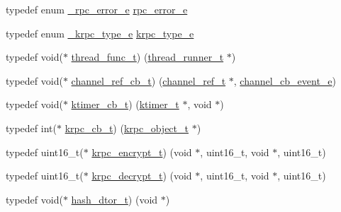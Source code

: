 \begin{DoxyCompactItemize}
\item 
typedef enum \hyperlink{a00044_a5a9afdfc8281994f0692b49499d731bf_a5a9afdfc8281994f0692b49499d731bf}{\+\_\+rpc\+\_\+error\+\_\+e} \hyperlink{a00044_aba1e847dfcabe31256c7f60abe0272a6_aba1e847dfcabe31256c7f60abe0272a6}{rpc\+\_\+error\+\_\+e}
\item 
typedef enum \hyperlink{a00044_aa250e66ac76155c15e3e1d24d0431931_aa250e66ac76155c15e3e1d24d0431931}{\+\_\+krpc\+\_\+type\+\_\+e} \hyperlink{a00044_a6bca3ecacad337637254bb43ab58a0b6_a6bca3ecacad337637254bb43ab58a0b6}{krpc\+\_\+type\+\_\+e}
\item 
typedef void($\ast$ \hyperlink{a00044_a46bcd8005e5d86fdbc6be5af0a77156c_a46bcd8005e5d86fdbc6be5af0a77156c}{thread\+\_\+func\+\_\+t}) (\hyperlink{a00044_a9054159cde2f926ef61c28ce1e555199_a9054159cde2f926ef61c28ce1e555199}{thread\+\_\+runner\+\_\+t} $\ast$)
\item 
typedef void($\ast$ \hyperlink{a00044_ae296ec4d1ce108960de8dcc423956a1d_ae296ec4d1ce108960de8dcc423956a1d}{channel\+\_\+ref\+\_\+cb\+\_\+t}) (\hyperlink{a00044_a151271c9d188ef28d4d24bb81dcc1263_a151271c9d188ef28d4d24bb81dcc1263}{channel\+\_\+ref\+\_\+t} $\ast$, \hyperlink{a00044_aaf2cba5d4035f3d56350b59342ebf65c_aaf2cba5d4035f3d56350b59342ebf65c}{channel\+\_\+cb\+\_\+event\+\_\+e})
\item 
typedef void($\ast$ \hyperlink{a00044_a2333fd0f2c3a85faf586300ca40deed4_a2333fd0f2c3a85faf586300ca40deed4}{ktimer\+\_\+cb\+\_\+t}) (\hyperlink{a00044_a846172ea4e8a86449eca41a3d8e074b7_a846172ea4e8a86449eca41a3d8e074b7}{ktimer\+\_\+t} $\ast$, void $\ast$)
\item 
typedef int($\ast$ \hyperlink{a00044_a06bb708c1b97445d3a5d0c1b32ad2ab6_a06bb708c1b97445d3a5d0c1b32ad2ab6}{krpc\+\_\+cb\+\_\+t}) (\hyperlink{a00044_a9c07dfc8c3b965f75b09f82fdb1bbb1e_a9c07dfc8c3b965f75b09f82fdb1bbb1e}{krpc\+\_\+object\+\_\+t} $\ast$)
\item 
typedef uint16\+\_\+t($\ast$ \hyperlink{a00044_ae41a67cc07f8dff897ca978e03b1f2d7_ae41a67cc07f8dff897ca978e03b1f2d7}{krpc\+\_\+encrypt\+\_\+t}) (void $\ast$, uint16\+\_\+t, void $\ast$, uint16\+\_\+t)
\item 
typedef uint16\+\_\+t($\ast$ \hyperlink{a00044_a5cf750f151c90f0589f68fe8c4421f1d_a5cf750f151c90f0589f68fe8c4421f1d}{krpc\+\_\+decrypt\+\_\+t}) (void $\ast$, uint16\+\_\+t, void $\ast$, uint16\+\_\+t)
\item 
typedef void($\ast$ \hyperlink{a00044_a5dcd1ed9242185e4448352748e58573d_a5dcd1ed9242185e4448352748e58573d}{hash\+\_\+dtor\+\_\+t}) (void $\ast$)
\end{DoxyCompactItemize}
